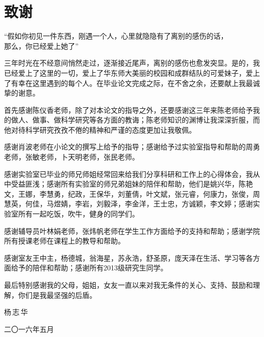{\kaishu
{\chapter*{\vspace{-3cm} 致\qquad 谢}}

\vspace{-0.5cm}

\begin{center} 
``假如你初见一件东西，刚遇一个人，心里就隐隐有了离别的感伤的话，\\那么，你已经爱上她了''
\end{center}

三年时光在不经意间悄然走过，逐渐接近尾声，离别的感伤也愈发突显。是的，我已经爱上了这里的一切，爱上了华东师大美丽的校园和成群结队的可爱妹子，爱上了有幸在这里遇到的每个人。在毕业论文完成之际，在不舍之余，还要献上我最诚挚的谢意。

首先感谢陈仪香老师，除了对本论文的指导之外，还要感谢这三年来陈老师给予我的做人、做事、做科学研究等各方面的教诲；陈老师知识的渊博让我深深折服，而他对待科学研究孜孜不倦的精神和严谨的态度更加让我敬佩。

感谢肖波老师在小论文的撰写上给予的指导；感谢给予过实验室指导和帮助的周勇老师，张敏老师，卜天明老师，张民老师。

感谢实验室已毕业的师兄师姐经常回来给我们分享科研和工作上的心得体会，我从中受益匪浅；感谢所有实验室的师兄弟姐妹的陪伴和帮助，他们是姚兴华，陈艳文，王娜，李慧勇，纪政，王保华，刘董倩，叶文斌，张元睿，何康力，张俊，周慧英，何佳，马煜婧，李岩，刘毅泽，李金洋，王士忠，方诚颖，李文婷；感谢实验室所有一起吃饭，吹牛，健身的同学们。

感谢辅导员叶林娟老师，张炜帆老师在学生工作方面给予的支持和帮助；感谢学院所有授课老师在课程上的教导和帮助。

感谢室友王中主，杨德城，翁海星，苏永浩，舒圣原，庞天泽在生活、学习等各方面给予的陪伴和帮助；感谢所有2013级研究生同学。

最后特别感谢我的父母，姐姐，女友一直以来对我无条件的关心、支持、鼓励和理解，你们是我最坚强的后盾。

\vspace{0.2cm} \hspace{11.5cm}  杨\,志\,华

\hspace{10.6cm}  二〇一六年五月 }
